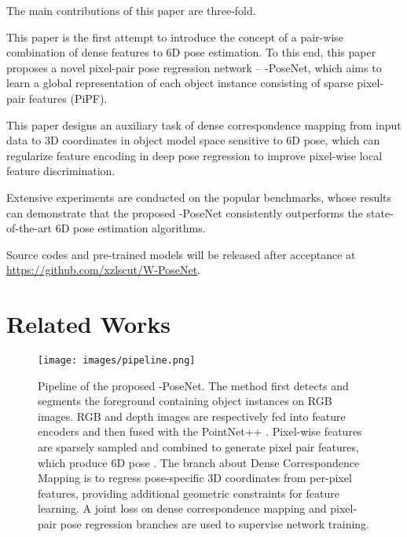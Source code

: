 \documentclass[letterpaper, 10 pt, conference]{ieeeconf}
\newenvironment{packed_itemize}{
\begin{itemize}
  \setlength{\itemsep}{1pt}
  \setlength{\parskip}{0pt}
  \setlength{\parsep}{0pt}
}{\end{itemize}}
\begin{document}
The main contributions of this paper are three-fold.
\begin{packed_itemize}
\item This paper is the first attempt to introduce the concept of a pair-wise combination of dense features to 6D pose estimation. To this end, this paper proposes a novel pixel-pair pose regression network -- -PoseNet, which aims to learn a global representation of each object instance consisting of sparse pixel-pair features (PiPF).
\item This paper designs an auxiliary task of dense correspondence mapping from input data to 3D coordinates in object model space sensitive to 6D pose, which can regularize feature encoding in deep pose regression to improve pixel-wise local feature discrimination.
\item Extensive experiments are conducted on the popular benchmarks, whose results can demonstrate that the proposed -PoseNet consistently outperforms the state-of-the-art 6D pose estimation algorithms. 
\end{packed_itemize}
Source codes and pre-trained models will be released after acceptance at 
{\url{https://github.com/xzlscut/W-PoseNet}}.

\section{Related Works}
\begin{figure*}[t]
\centering
\texttt{[image: images/pipeline.png]}
\caption{Pipeline of the proposed -PoseNet. The method first detects and segments the foreground containing object instances on RGB images. RGB and depth images are respectively fed into feature encoders and then fused with the PointNet++ \cite{qi2017pointnet++}. Pixel-wise features are sparsely sampled and combined to generate pixel pair features, which produce 6D pose . The branch about Dense Correspondence Mapping is to regress pose-specific 3D coordinates from per-pixel features, providing additional geometric constraints for feature learning. A joint loss on dense correspondence mapping and pixel-pair pose regression branches are used to supervise network training. }
\label{fig:pipeline}\vspace{-0.5cm}
\end{figure*}
\end{document}

